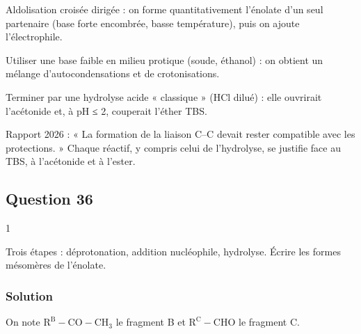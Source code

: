 \documentclass[11pt,a4paper]{article}
\begin{document}
\begin{methode}

Aldolisation croisée dirigée : on forme quantitativement l'énolate d'un seul partenaire (base forte encombrée, basse température), puis on ajoute l'électrophile.

\end{methode}

\begin{piege}

Utiliser une base faible en milieu protique (soude, éthanol) : on obtient un mélange d'autocondensations et de crotonisations.

\end{piege}

\begin{piege}

Terminer par une hydrolyse acide « classique » (HCl dilué) : elle ouvrirait l'acétonide et, à pH ≤ 2, couperait l'éther TBS.

\end{piege}

\begin{jury}

Rapport 2026 : « La formation de la liaison C--C devait rester compatible avec les protections. » Chaque réactif, y compris celui de l'hydrolyse, se justifie face au TBS, à l'acétonide et à l'ester.

\end{jury}

\hypertarget{question-36}{%
\subsection{Question 36}\label{question-36}}

\begin{indication}{1}

Trois étapes : déprotonation, addition nucléophile, hydrolyse. Écrire les formes mésomères de l'énolate.

\end{indication}

\hypertarget{solution-35}{%
\subsubsection{Solution}\label{solution-35}}

On note \(\mathrm{R^B{-}CO{-}CH_3}\) le fragment B et \(\mathrm{R^C{-}CHO}\) le fragment C.
\end{document}
